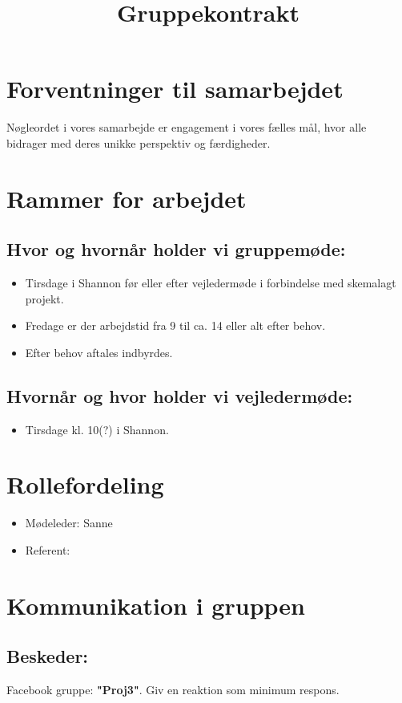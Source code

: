 \documentclass[a4paper,12pt]{article}
\title{Gruppekontrakt}
\author{}
\date{}
\begin{document}
\maketitle

\section*{Forventninger til samarbejdet}
Nøgleordet i vores samarbejde er engagement i vores fælles mål, hvor alle bidrager med deres unikke perspektiv og færdigheder.

\section*{Rammer for arbejdet}
\subsection*{Hvor og hvornår holder vi gruppemøde:}
\begin{itemize}
    \item Tirsdage i Shannon før eller efter vejledermøde i forbindelse med skemalagt projekt.
    \item Fredage er der arbejdstid fra 9 til ca. 14 eller alt efter behov.
    \item Efter behov aftales indbyrdes.
\end{itemize}

\subsection*{Hvornår og hvor holder vi vejledermøde:}
\begin{itemize}
    \item Tirsdage kl. 10(?) i Shannon.
\end{itemize}

\section*{Rollefordeling}
\begin{itemize}
    \item Mødeleder: Sanne
    \item Referent: 
\end{itemize}

\section*{Kommunikation i gruppen}
\subsection*{Beskeder:}
Facebook gruppe: \textbf{"Proj3"}. Giv en reaktion som minimum respons.
\end{document}
